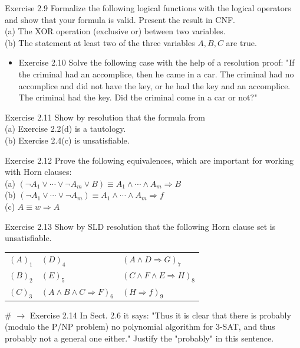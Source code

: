 \documentclass[10pt]{book}
\begin{document}
Exercise 2.9 Formalize the following logical functions with the logical operators and show that your formula is valid. Present the result in CNF.\\
(a) The XOR operation (exclusive or) between two variables.\\
(b) The statement at least two of the three variables $A, B, C$ are true.

\begin{itemize}
  \item Exercise 2.10 Solve the following case with the help of a resolution proof: "If the criminal had an accomplice, then he came in a car. The criminal had no accomplice and did not have the key, or he had the key and an accomplice. The criminal had the key. Did the criminal come in a car or not?"
\end{itemize}

Exercise 2.11 Show by resolution that the formula from\\
(a) Exercise 2.2(d) is a tautology.\\
(b) Exercise 2.4(c) is unsatisfiable.

Exercise 2.12 Prove the following equivalences, which are important for working with Horn clauses:\\
(a) $\left(\neg A_{1} \vee \cdots \vee \neg A_{m} \vee B\right) \equiv A_{1} \wedge \cdots \wedge A_{m} \Rightarrow B$\\
(b) $\left(\neg A_{1} \vee \cdots \vee \neg A_{m}\right) \equiv A_{1} \wedge \cdots \wedge A_{m} \Rightarrow f$\\
(c) $A \equiv w \Rightarrow A$

Exercise 2.13 Show by SLD resolution that the following Horn clause set is unsatisfiable.

\begin{center}
\begin{tabular}{lll}
$(A)_{1}$ & $(D)_{4}$ & $(A \wedge D \Rightarrow G)_{7}$ \\
$(B)_{2}$ & $(E)_{5}$ & $(C \wedge F \wedge E \Rightarrow H)_{8}$ \\
$(C)_{3}$ & $(A \wedge B \wedge C \Rightarrow F)_{6}$ & $(H \Rightarrow f)_{9}$ \\
\end{tabular}
\end{center}

\# $\rightarrow$ Exercise 2.14 In Sect. 2.6 it says: "Thus it is clear that there is probably (modulo the P/NP problem) no polynomial algorithm for 3-SAT, and thus probably not a general one either." Justify the "probably" in this sentence.
\end{document}
